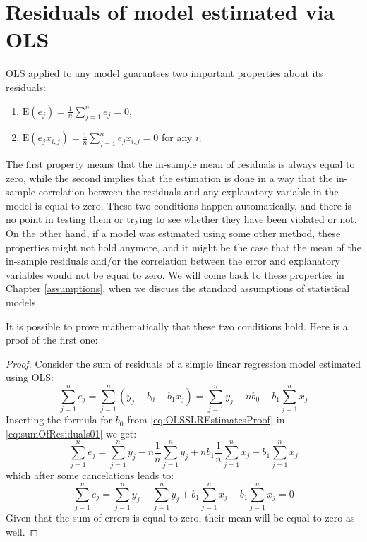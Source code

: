 \documentclass[
]{book}
\providecommand{\tightlist}{%
  \setlength{\itemsep}{0pt}\setlength{\parskip}{0pt}}
\theoremstyle{definition}
\theoremstyle{definition}
\theoremstyle{definition}
\theoremstyle{definition}
\theoremstyle{remark}
\begin{document}
\section{Residuals of model estimated via OLS}\label{OLSResiduals}

OLS applied to any model guarantees two important properties about its residuals:

\begin{enumerate}
\def\labelenumi{\arabic{enumi}.}
\tightlist
\item
  \(\mathrm{E}(e_j) = \frac{1}{n} \sum_{j=1}^n e_j = 0\),
\item
  \(\mathrm{E}(e_j x_{i,j}) = \frac{1}{n} \sum_{j=1}^n e_j x_{i,j} = 0\) for any \(i\).
\end{enumerate}

The first property means that the in-sample mean of residuals is always equal to zero, while the second implies that the estimation is done in a way that the in-sample correlation between the residuals and any explanatory variable in the model is equal to zero. These two conditions happen automatically, and there is no point in testing them or trying to see whether they have been violated or not. On the other hand, if a model was estimated using some other method, these properties might not hold anymore, and it might be the case that the mean of the in-sample residuals and/or the correlation between the error and explanatory variables would not be equal to zero. We will come back to these properties in Chapter \ref{assumptions}, when we discuss the standard assumptions of statistical models.

It is possible to prove mathematically that these two conditions hold. Here is a proof of the first one:

\begin{proof}
Consider the sum of residuals of a simple linear regression model estimated using OLS:
\begin{equation}
    \sum_{j=1}^n e_j = \sum_{j=1}^n (y_j - b_0 - b_1 x_j) = \sum_{j=1}^n y_j - n b_0 - b_1  \sum_{j=1}^n x_j
    \label{eq:sumOfResiduals01}
\end{equation}
Inserting the formula for \(b_0\) from \eqref{eq:OLSSLREstimatesProof} in \eqref{eq:sumOfResiduals01} we get:
\begin{equation}
    \sum_{j=1}^n e_j = \sum_{j=1}^n y_j - n \frac{1}{n}\sum_{j=1}^n y_j + n b_1 \frac{1}{n}\sum_{j=1}^n x_j - b_1  \sum_{j=1}^n x_j
    \label{eq:sumOfResiduals02}
\end{equation}
which after some cancelations leads to:
\begin{equation}
    \sum_{j=1}^n e_j = \sum_{j=1}^n y_j - \sum_{j=1}^n y_j + b_1 \sum_{j=1}^n x_j - b_1 \sum_{j=1}^n x_j = 0
    \label{eq:sumOfResiduals03}
\end{equation}
Given that the sum of errors is equal to zero, their mean will be equal to zero as well.
\end{proof}
\end{document}
